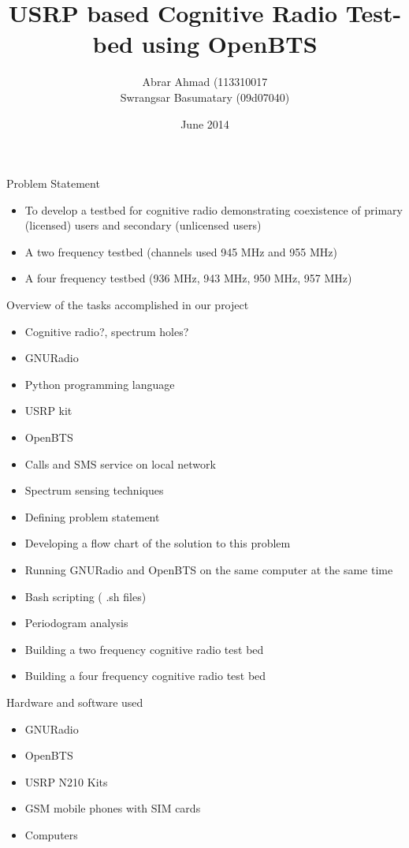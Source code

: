 \documentclass{beamer}
\title{USRP based Cognitive Radio Test-bed using OpenBTS}
\author{Abrar Ahmad (113310017 \\ Swrangsar Basumatary (09d07040)}
\institute{Department of Electrical Engineering \\ IIT Bombay, Powai}
\date{June 2014}
\begin{document}
  \frame{\titlepage}


	\begin{frame}{Problem Statement}
    	\begin{itemize}
    		\item To develop a testbed for cognitive radio demonstrating coexistence of primary (licensed) users and secondary (unlicensed users)
    		\item A two frequency testbed (channels used 945 MHz and 955 MHz)
    		\item A four frequency testbed (936 MHz, 943 MHz, 950 MHz, 957 MHz)
    	\end{itemize}
	\end{frame}
	
	\begin{frame}{Overview of the tasks accomplished in our project}
		\begin{itemize}
      \item Cognitive radio?,  spectrum holes?
      \item GNURadio
      \item Python programming language
      \item USRP kit
      \item OpenBTS
      \item Calls and SMS service on local network
      \item Spectrum sensing techniques
      \item Defining problem statement
    \end{itemize}
  \end{frame}
    
    \begin{frame}{}
        \begin{itemize}
		\item Developing a flow chart of the solution to this problem
		\item Running GNURadio and OpenBTS  on the same computer at the same time
		\item Bash scripting ( .sh files)
		\item Periodogram analysis
		\item Building a two frequency cognitive radio test bed
		\item Building a four frequency cognitive radio test bed
		\end{itemize}
	\end{frame}
	
	\begin{frame}{Hardware and software used}
    \begin{itemize}
      \item GNURadio
      \item OpenBTS
      \item USRP N210  Kits
      \item GSM mobile phones with SIM cards
      \item Computers
    \end{itemize}
  \end{frame}
\end{document}
